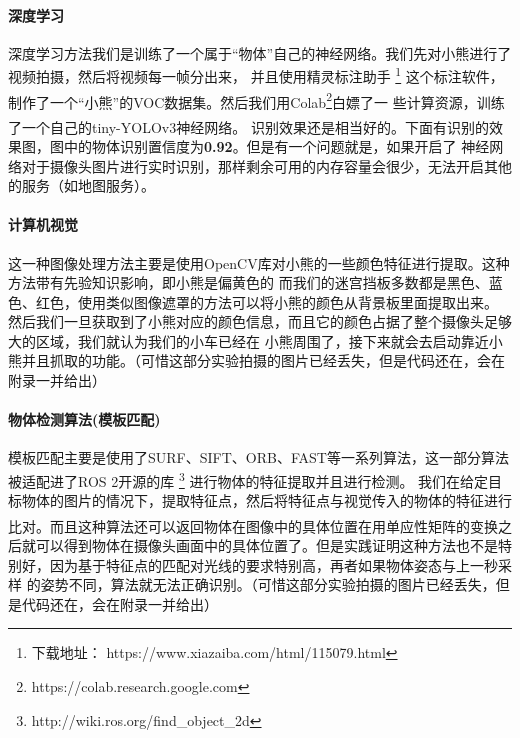 \documentclass[a4paper,twoside]{article}
\newcommand{\upcite}[1]{\textsuperscript{\textsuperscript{\cite{#1}}}}
\begin{document}
\paragraph{深度学习}
深度学习方法我们是训练了一个属于“物体”自己的神经网络。我们先对小熊进行了视频拍摄，然后将视频每一帧分出来，
并且使用精灵标注助手 \footnote{下载地址： https://www.xiazaiba.com/html/115079.html} 这个标注软件，
制作了一个“小熊”的VOC数据集\upcite{createdataset}。然后我们用Colab\footnote{https://colab.research.google.com}白嫖了一
些计算资源，训练了一个自己的tiny-YOLOv3神经网络\upcite{trainyolo}。
识别效果还是相当好的。下面有识别的效果图，图中的物体识别置信度为\textbf{0.92}。但是有一个问题就是，如果开启了
神经网络对于摄像头图片进行实时识别，那样剩余可用的内存容量会很少，无法开启其他的服务（如地图服务）。

\paragraph{计算机视觉}
这一种图像处理方法主要是使用OpenCV库对小熊的一些颜色特征进行提取。这种方法带有先验知识影响，即小熊是偏黄色的
而我们的迷宫挡板多数都是黑色、蓝色、红色，使用类似图像遮罩的方法可以将小熊的颜色从背景板里面提取出来。
然后我们一旦获取到了小熊对应的颜色信息，而且它的颜色占据了整个摄像头足够大的区域，我们就认为我们的小车已经在
小熊周围了，接下来就会去启动靠近小熊并且抓取的功能。（可惜这部分实验拍摄的图片已经丢失，但是代码还在，会在附录一并给出）


\paragraph{物体检测算法(模板匹配)}
模板匹配主要是使用了SURF、SIFT、ORB、FAST等一系列算法，这一部分算法被适配进了ROS 2开源的库 \footnote{http://wiki.ros.org/find\_object\_2d} 进行物体的特征提取并且进行检测。
我们在给定目标物体的图片的情况下，提取特征点，然后将特征点与视觉传入的物体的特征进行比对。而且这种算法还可以返回物体在图像中的具体位置在用单应性矩阵的变换\upcite{matrix}之后就可以得到物体在摄像头画面中的具体位置了。但是实践证明这种方法也不是特别好，因为基于特征点的匹配对光线的要求特别高，再者如果物体姿态与上一秒采样
的姿势不同，算法就无法正确识别。（可惜这部分实验拍摄的图片已经丢失，但是代码还在，会在附录一并给出）
\end{document}
